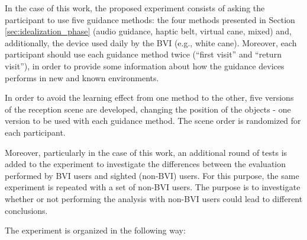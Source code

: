 In the case of this work, the proposed experiment consists of asking the participant to use five guidance methods: the four methods presented in Section \ref{sec:idealization_phase} (audio guidance, haptic belt, virtual cane, mixed) and, additionally, the device used daily by the BVI (e.g., white cane). Moreover, each participant should use each guidance method twice (“first visit” and “return visit”), in order to provide some information about how the guidance devices performs in new and known environments.

In order to avoid the learning effect from one method to the other, five versions of the reception scene are developed, changing the position of the objects - one version to be used with each guidance method. The scene order is randomized for each participant.

Moreover, particularly in the case of this work, an additional round of tests is added to the experiment to investigate the differences between the evaluation performed by BVI users and sighted (non-BVI) users. For this purpose, the same experiment is repeated with a set of non-BVI users. The purpose is to investigate whether or not performing the analysis with non-BVI users could lead to different conclusions.

The experiment is organized in the following way:

